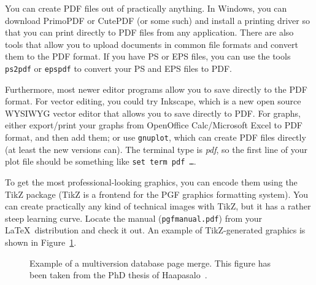 You can create PDF files out of practically anything.
In Windows, you can download PrimoPDF or CutePDF (or some such) and install a
printing driver so that you can print directly to PDF files from any
application. There are also tools that allow you to upload documents in common
file formats and convert them to the PDF format.
If you have PS or EPS files, you can use the tools \texttt{ps2pdf} or
\texttt{epspdf} to convert your PS and EPS files to PDF\@.



Furthermore, most newer editor programs allow you to save directly to the PDF
format. For vector editing, you could try Inkscape, which is a new open source
WYSIWYG vector editor that allows you to save directly to PDF\@.
For graphs, either export/print your graphs from OpenOffice Calc/Microsoft
Excel to PDF format, and then add them; or use \texttt{gnuplot}, which can
create PDF files directly (at least the new versions can).
The terminal type is \emph{pdf}, so the first line of your plot file should be
something like \texttt{set term pdf \ldots}.

To get the most professional-looking graphics, you can encode them using the
TikZ package (TikZ is a frontend for the PGF graphics formatting system).
You can create practically any kind of technical images with TikZ, but it has a
rather steep learning curve. Locate the manual (\texttt{pgfmanual.pdf}) from
your \LaTeX\ distribution and check it out. An example of TikZ-generated
graphics is shown in Figure~\ref{fig:page-merge}.

\begin{figure}[ht]
  \begin{center}
    
    \caption{Example of a multiversion database page merge. This figure has
    been taken from the PhD thesis of Haapasalo~\cite{HaapasaloThesis}.}
    \label{fig:page-merge}
  \end{center}
\end{figure}


